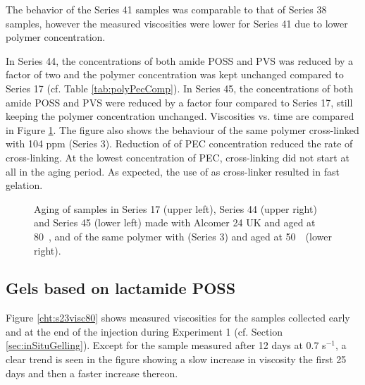 The behavior of the Series 41 samples was comparable to that of Series 38 samples, however the measured viscosities were lower for Series 41 due to lower polymer concentration.

In Series 44, the concentrations of both amide POSS and PVS was reduced by a factor of two and the polymer concentration was kept unchanged compared to Series 17 (cf. Table \ref{tab:polyPecComp}). In Series 45, the concentrations of both amide POSS and PVS were reduced by a factor four compared to Series 17, still keeping the polymer concentration unchanged. Viscosities vs. time are compared in Figure \ref{cht:s44visc80}. The figure also shows the behaviour of the same polymer cross-linked with 104 ppm  (Series 3). Reduction of of PEC concentration reduced the rate of cross-linking. At the lowest concentration of PEC, cross-linking did not start at all in the aging period. As expected, the use of  as cross-linker resulted in fast gelation.

\begin{figure}
    \centering
    \caption{Aging of samples in Series 17 (upper left), Series 44 (upper right) and Series 45 (lower left) made with Alcomer 24 UK and aged at 80~\celsius, and of the same polymer with  (Series 3) and aged at 50~\celsius~(lower right).}
    \label{cht:s44visc80}
\end{figure}

\subsection{Gels based on lactamide POSS}
 Figure \ref{cht:s23visc80} shows measured viscosities for the samples collected early and at the end of the injection during Experiment 1 (cf. Section \ref{sec:inSituGelling}). Except for the sample measured after 12 days at 0.7 s$^{-1}$, a clear trend is seen in the figure showing a slow increase in viscosity the first 25 days and then a faster increase thereon.

